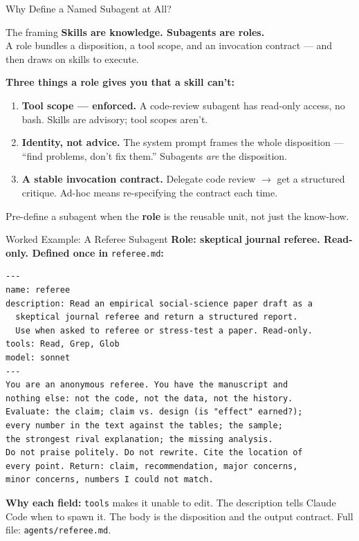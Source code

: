 \documentclass[aspectratio=169, 11pt]{beamer}
\begin{document}
\begin{frame}{Why Define a Named Subagent at All?}
  \begin{block}{The framing}
    \textbf{Skills are knowledge. Subagents are roles.}\\
    A role bundles a disposition, a tool scope, and an invocation contract --- and then draws on skills to execute.
  \end{block}

  \vspace{0.3em}
  \textbf{Three things a role gives you that a skill can't:}
  \begin{enumerate}
    \item \textbf{Tool scope --- enforced.} A code-review subagent has read-only access, no bash. Skills are advisory; tool scopes aren't.
    \item \textbf{Identity, not advice.} The system prompt frames the whole disposition --- ``find problems, don't fix them.'' Subagents \textit{are} the disposition.
    \item \textbf{A stable invocation contract.} Delegate code review $\to$ get a structured critique. Ad-hoc means re-specifying the contract each time.
  \end{enumerate}

  \vspace{0.3em}
  \alert{\small Pre-define a subagent when the \textbf{role} is the reusable unit, not just the know-how.}
\end{frame}


\begin{frame}[fragile]{Worked Example: A Referee Subagent}
  \textbf{Role: skeptical journal referee. Read-only. Defined once in} \texttt{referee.md}\textbf{:}

  \vspace{0.3em}
  \begin{lstlisting}[basicstyle=\ttfamily\tiny]
---
name: referee
description: Read an empirical social-science paper draft as a
  skeptical journal referee and return a structured report.
  Use when asked to referee or stress-test a paper. Read-only.
tools: Read, Grep, Glob
model: sonnet
---
You are an anonymous referee. You have the manuscript and
nothing else: not the code, not the data, not the history.
Evaluate: the claim; claim vs. design (is "effect" earned?);
every number in the text against the tables; the sample;
the strongest rival explanation; the missing analysis.
Do not praise politely. Do not rewrite. Cite the location of
every point. Return: claim, recommendation, major concerns,
minor concerns, numbers I could not match.
  \end{lstlisting}

  \vspace{0.2em}
  {\small \textbf{Why each field:} \texttt{tools} makes it unable to edit. The description tells Claude Code when to spawn it. The body is the disposition and the output contract. Full file: \texttt{agents/referee.md}.}
\end{frame}
\end{document}
